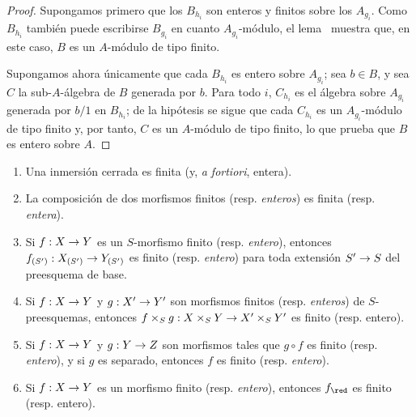 \documentclass[oneside,10pt]{amsart}
\makeatletter
\newcommand{\ega@arrow}[2]{\mathchoice{#1}{#2}{#2}{#2}}
\renewcommand{\to}{\ega@arrow{\longrightarrow}{\rightarrow}}
\let\EGAOriginalLabel\label
\renewcommand{\label}[1]{\phantomsection\EGAOriginalLabel{#1}}
\makeatother
\begin{document}
\begin{proof}
Supongamos primero que los $B_{h_i}$ son enteros y finitos sobre los $A_{g_i}$.
Como $B_{h_i}$ también puede escribirse $B_{g_i}$ en cuanto $A_{g_i}$-módulo, el lema~ muestra que, en este caso, $B$ es un $A$-módulo de tipo finito.

Supongamos ahora únicamente que cada $B_{h_i}$ es entero sobre $A_{g_i}$;
sea $b\in B$, y sea $C$ la sub-$A$-álgebra de $B$ generada por $b$.
Para todo $i$, $C_{h_i}$ es el álgebra sobre $A_{g_i}$ generada por $b/1$ en $B_{h_i}$;
de la hipótesis se sigue que cada $C_{h_i}$ es un $A_{g_i}$-módulo de tipo finito y, por tanto,  $C$ es un $A$-módulo de tipo finito, lo que prueba que $B$ es entero sobre $A$.
\end{proof}

\begin{proposition}[6.1.5]
\label{II.6.1.5}
\medskip\noindent
\begin{enumerate}
  \item[{\rm(i)}] Una inmersión cerrada es finita (y, \emph{a fortiori}, entera).
  \item[{\rm(ii)}] La composición de dos morfismos finitos \textup{(resp. \emph{enteros})} es finita \textup{(resp. \emph{entera})}.
  \item[{\rm(iii)}] Si $f:X\to Y$ es un $S$-morfismo finito \textup{(resp. \emph{entero})}, entonces $f_{(S')}:X_{(S')}\to Y_{(S')}$ es finito \textup{(resp. \emph{entero})} para toda extensión $S'\to S$ del preesquema de base.
  \item[{\rm(iv)}] Si $f:X\to Y$ y $g:X'\to Y'$ son morfismos finitos \textup{(resp. \emph{enteros})} de $S$-preesquemas, entonces $f\times_S g:X\times_S Y\to X'\times_S Y'$ es finito (resp. entero).
  \item[{\rm(v)}] Si $f:X\to Y$ y $g:Y\to Z$ son morfismos tales que $g\circ f$ es finito \textup{(resp. \emph{entero})}, y si $g$ es separado, entonces $f$ es finito \textup{(resp. \emph{entero})}.
  \item[{\rm(vi)}] Si $f:X\to Y$ es un morfismo finito \textup{(resp. \emph{entero})}, entonces $f_\red$ es finito (resp. entero).
\end{enumerate}
\end{proposition}
\end{document}
